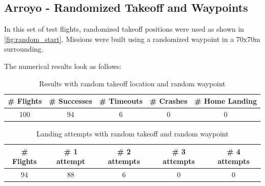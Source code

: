 
\subsection{Arroyo - Randomized Takeoff and Waypoints}\label{subsec:compl_rand}

    In this set of test flights, randomized takeoff positions were used as shown in \cref{fig:random_start}. Missions were built using a randomized waypoint in a 70x70m surrounding.

    The numerical results look as follows:

    \begin{table}[h]
        \begin{center}
         \caption{Results with random takeoff location and random waypoint}\vspace{1ex}
         \label{tab:result_complete_rand}
         \begin{tabular}{|c|c|c|c|c|}
         \hline
         \# Flights & \# Successes & \# Timeouts & \# Crashes & \# Home Landing\\ \hline \hline
         100 & 94 & 6 & 0 & 0 \\
         \hline
         \end{tabular}
        \end{center}
    \end{table}
    \begin{table}[h]
        \begin{center}
         \caption{Landing attempts with random takeoff and random waypoint}\vspace{1ex}
         \label{tab:land_nums_complete_rand}
         \begin{tabular}{|c|c|c|c|c|}
         \hline
         \# Flights & \# 1 attempt & \# 2 attempts & \# 3 attempts & \# 4 attempts\\ \hline \hline
         94 & 88 & 6 & 0 & 0 \\
         \hline
         \end{tabular}
        \end{center}
    \end{table}


